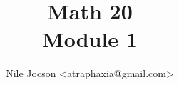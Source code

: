 \documentclass{article}
\title{
	Math 20 \\
	Module 1
}
\author{Nile Jocson \textless{}atraphaxia@gmail.com\textgreater{}}
\begin{document}
	\maketitle{}
		\pagebreak{}

	\tableofcontents{}
		\pagebreak{}

	
	
	
	
\end{document}
